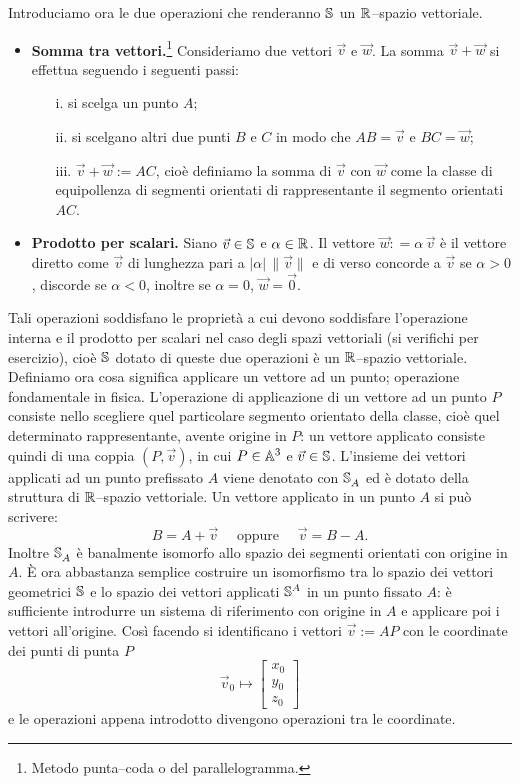 Introduciamo ora le due operazioni che renderanno $\mathbb{S}^{}$ un $\mathbb{R}^{}$--spazio 
vettoriale. 

\begin{itemize}
  \item \textbf{Somma tra vettori.}\footnote{Metodo punta--coda o del 
parallelogramma.} 
  Consideriamo due vettori $\vec v$ e $\vec w$. La somma
  $\vec v+\vec w$ si effettua seguendo i seguenti passi:
  \begin{itemize}
    \item[i.] si scelga un punto $A$;
    \item[ii.] si scelgano altri due punti $B$ e $C$ in modo che $AB = \vec v$ 
e $BC = \vec w$;
    \item[iii.] $\vec v+\vec w := AC$, cioè definiamo la somma di $\vec v$ con 
$\vec w$ come
    la classe di equipollenza di segmenti orientati di rappresentante il 
segmento orientati
    $AC$. 
  \end{itemize}
  \item \textbf{Prodotto per scalari.} Siano $\vec v\in\mathbb{S}^{}$ e 
$\alpha\in\mathbb{R}^{}$. Il vettore 
  $\vec w: = \alpha \,\vec v$ è il vettore diretto come $\vec v$ di lunghezza 
pari a 
  $|\alpha|\, \|\vec v\|$ e di verso concorde a $\vec v$ se $\alpha>0$, 
discorde se $\alpha<0$, 
  inoltre se $\alpha = 0$, $\vec w = \vec 0$. 
\end{itemize}
Tali operazioni soddisfano le proprietà a cui devono soddisfare l'operazione 
interna 
e il prodotto per scalari nel caso degli spazi vettoriali (si verifichi per 
esercizio), 
cioè $\mathbb{S}^{}$ dotato di queste due operazioni è un $\mathbb{R}^{}$--spazio 
vettoriale.\\

Definiamo ora cosa significa applicare un vettore ad un punto; operazione 
fondamentale 
in fisica. L'operazione di applicazione di un vettore ad un punto $P$ consiste 
nello scegliere
quel particolare segmento orientato della classe, cioè quel determinato 
rappresentante,
avente origine in $P$: un vettore applicato consiste quindi di una coppia 
$(P,\vec v)$, 
in cui $P\in\mathbb{A}^{3}$ e $\vec v\in \mathbb{S}^{}$. L'insieme dei vettori applicati ad un 
punto prefissato $A$
viene denotato con $\mathbb{S}^{}_A$ ed è dotato della struttura di $\mathbb{R}^{}$--spazio 
vettoriale. 
Un vettore applicato in un punto $A$ si può scrivere:
\[
  B = A+\vec v \quad \textrm{ oppure }\quad  \vec v= B-A.
\]
Inoltre $\mathbb{S}^{}_A$ è banalmente isomorfo allo spazio dei segmenti orientati con 
origine in $A$.
\`E ora abbastanza semplice costruire un isomorfismo tra lo spazio dei vettori 
geometrici
$\mathbb{S}^{}$ e lo spazio dei vettori applicati $\mathbb{S}^{A}$ in un punto fissato $A$: è 
sufficiente
introdurre un sistema di riferimento con origine in $A$ e applicare poi i 
vettori all'origine.
Così facendo si identificano i vettori $\vec v:= AP$ con le coordinate dei 
punti di punta $P$
\[
  \vec v_0 \longmapsto \begin{bmatrix} x_0\\y_0\\z_0 \end{bmatrix}
\]
e le operazioni appena introdotto divengono operazioni tra le coordinate.

